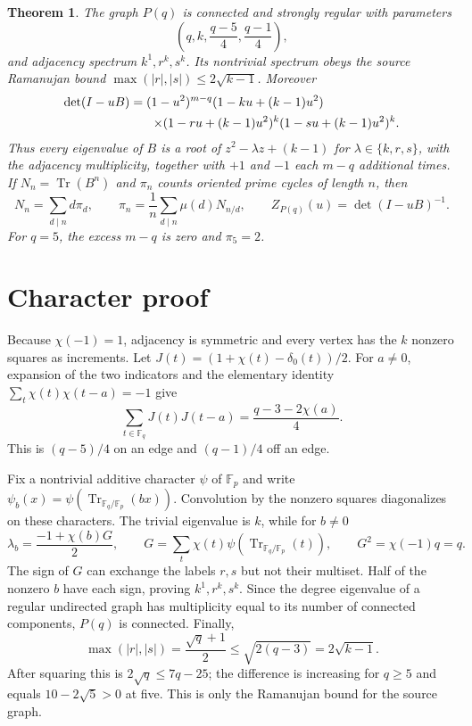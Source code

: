 \documentclass[10pt]{article}
\newtheorem{theorem}{Theorem}
\newcommand{\F}{\mathbb F}
\newcommand{\Tr}{\operatorname{Tr}}
\begin{document}
\begin{theorem}\label{thm:main}
The graph $P(q)$ is connected and strongly regular with parameters
\[
 \left(q,k,\frac{q-5}{4},\frac{q-1}{4}\right),
\]
and adjacency spectrum $k^1,r^k,s^k$.  Its nontrivial spectrum obeys the
source Ramanujan bound $\max(|r|,|s|)\leq2\sqrt{k-1}$.  Moreover
\begin{align}
 \det(I-uB)={}&(1-u^2)^{m-q}(1-ku+(k-1)u^2)\notag\\
 &\mathrel{}\times(1-ru+(k-1)u^2)^k(1-su+(k-1)u^2)^k.\label{eq:bass}
\end{align}
Thus every eigenvalue of $B$ is a root of
$z^2-\lambda z+(k-1)$ for $\lambda\in\{k,r,s\}$, with the adjacency
multiplicity, together with $+1$ and $-1$ each $m-q$ additional times.
If $N_n=\Tr(B^n)$ and $\pi_n$ counts oriented prime cycles of length $n$, then
\[
 N_n=\sum_{d\mid n}d\pi_d,\qquad
 \pi_n=\frac1n\sum_{d\mid n}\mu(d)N_{n/d},\qquad
 Z_{P(q)}(u)=\det(I-uB)^{-1}.
\]
For $q=5$, the excess $m-q$ is zero and $\pi_5=2$.
\end{theorem}

\section{Character proof}
Because $\chi(-1)=1$, adjacency is symmetric and every vertex has the $k$
nonzero squares as increments.  Let
$J(t)=(1+\chi(t)-\delta_0(t))/2$.  For $a\ne0$, expansion of the two indicators
and the elementary identity
$\sum_t\chi(t)\chi(t-a)=-1$ give
\[
 \sum_{t\in\F_q}J(t)J(t-a)=\frac{q-3-2\chi(a)}4.
\]
This is $(q-5)/4$ on an edge and $(q-1)/4$ off an edge.

Fix a nontrivial additive character $\psi$ of $\F_p$ and write
$\psi_b(x)=\psi(\operatorname{Tr}_{\F_q/\F_p}(bx))$.  Convolution by the
nonzero squares diagonalizes on these characters.  The trivial eigenvalue is
$k$, while for $b\ne0$
\[
 \lambda_b=\frac{-1+\chi(b)G}{2},\qquad
 G=\sum_t\chi(t)\psi(\operatorname{Tr}_{\F_q/\F_p}(t)),\qquad
 G^2=\chi(-1)q=q.
\]
The sign of $G$ can exchange the labels $r,s$ but not their multiset.  Half of
the nonzero $b$ have each sign, proving $k^1,r^k,s^k$.  Since the degree
eigenvalue of a regular undirected graph has multiplicity equal to its number
of connected components, $P(q)$ is connected.  Finally,
\[
 \max(|r|,|s|)=\frac{\sqrt q+1}{2}\leq\sqrt{2(q-3)}=2\sqrt{k-1}.
\]
After squaring this is $2\sqrt q\leq7q-25$; the difference is increasing for
$q\geq5$ and equals $10-2\sqrt5>0$ at five.  This is only the Ramanujan bound
for the source graph.
\end{document}
